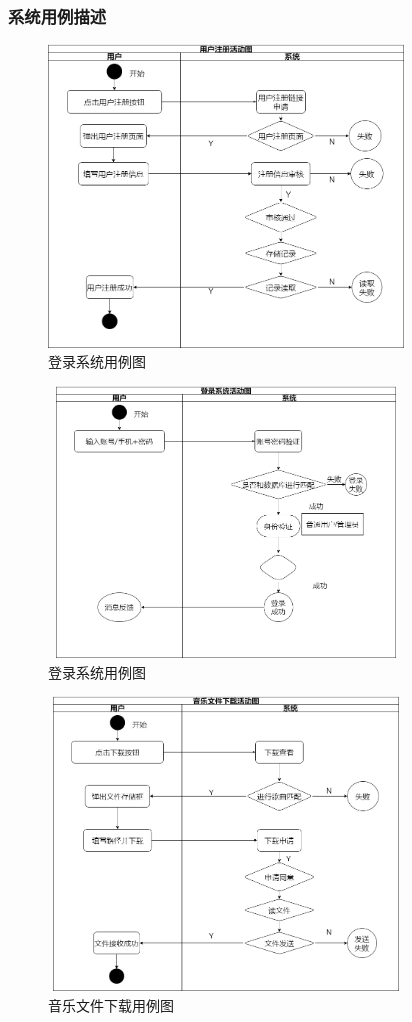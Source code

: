 \documentclass[UTF8,14pt]{article}
\numberwithin{figure}{subsubsection}
\numberwithin{table}{subsubsection}
\begin{document}
\subsubsection{系统用例描述}
\vspace*{-1cm}
\begin{figure}[H]
	\centering
	\includegraphics[width=9.41cm,height=8.03cm]{figures/用例图4.png}
	\caption{登录系统用例图}
\end{figure}
\vspace*{-1cm}
\begin{figure}[H]
	\centering
	\includegraphics[width=9.41cm,height=7.2cm]{figures/用例1.png}
	\caption{登录系统用例图}
\end{figure}
\vspace*{-1cm}
\begin{figure}[H]
	\centering
	\includegraphics[width=9.41cm,height=7.8cm]{figures/用例图2.png}
	\caption{音乐文件下载用例图}
\end{figure}
\end{document}
